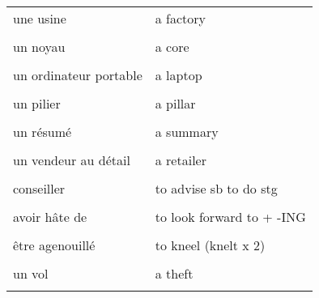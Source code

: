 \documentclass[
  10pt,
]{article}
\begin{document}
\begin{longtable}{ll}
une usine & a factory\\

\cellcolor{gray!6}{un intrus} & \cellcolor{gray!6}{an odd-one-out}\\

un noyau & a core\\

\cellcolor{gray!6}{un ordinateur de bureau} & \cellcolor{gray!6}{a desktop}\\

un ordinateur portable & a laptop\\

\cellcolor{gray!6}{un outil} & \cellcolor{gray!6}{a tool}\\

un pilier & a pillar\\

\cellcolor{gray!6}{un portail} & \cellcolor{gray!6}{a gate}\\

un résumé & a summary\\

\cellcolor{gray!6}{un sondage} & \cellcolor{gray!6}{a poll}\\

un vendeur au détail & a retailer\\

\cellcolor{gray!6}{un vif désir} & \cellcolor{gray!6}{a compulsion}\\

conseiller & to advise sb to do stg\\

\cellcolor{gray!6}{les sous-titres} & \cellcolor{gray!6}{the subtitles}\\

avoir hâte de & to look forward to + -ING\\

\cellcolor{gray!6}{être composé de} & \cellcolor{gray!6}{to be made up of}\\

être agenouillé & to kneel (knelt x 2)\\

\cellcolor{gray!6}{un pantalon} & \cellcolor{gray!6}{a pair of trousers}\\

un vol & a theft\\

\cellcolor{gray!6}{le personnel} & \cellcolor{gray!6}{the staff}\\


\end{longtable}
\end{document}
